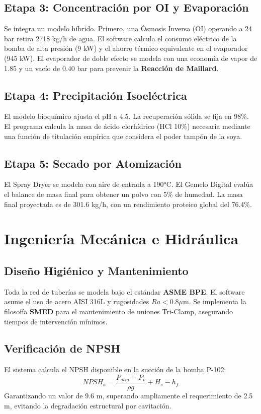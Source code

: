 \documentclass[12pt,a4paper,twocolumn]{article}
\begin{document}
\subsection{Etapa 3: Concentración por OI y Evaporación}
Se integra un modelo híbrido. Primero, una Ósmosis Inversa (OI) operando a 24 bar retira 2718 kg/h de agua. El software calcula el consumo eléctrico de la bomba de alta presión (9 kW) y el ahorro térmico equivalente en el evaporador (945 kW). 
El evaporador de doble efecto se modela con una economía de vapor de 1.85 y un vacío de 0.40 bar para prevenir la \textbf{Reacción de Maillard}.

\subsection{Etapa 4: Precipitación Isoeléctrica}
El modelo bioquímico ajusta el pH a 4.5. La recuperación sólida se fija en 98\%. El programa calcula la masa de ácido clorhídrico (HCl 10\%) necesaria mediante una función de titulación empírica que considera el poder tampón de la soya.

\subsection{Etapa 5: Secado por Atomización}
El Spray Dryer se modela con aire de entrada a 190°C. El Gemelo Digital evalúa el balance de masa final para obtener un polvo con 5\% de humedad. La masa final proyectada es de 301.6 kg/h, con un rendimiento proteico global del 76.4\%.

\section{Ingeniería Mecánica e Hidráulica}

\subsection{Diseño Higiénico y Mantenimiento}
Toda la red de tuberías se modela bajo el estándar \textbf{ASME BPE}. El software asume el uso de acero AISI 316L y rugosidades $Ra < 0.8 \mu$m. Se implementa la filosofía \textbf{SMED} para el mantenimiento de uniones Tri-Clamp, asegurando tiempos de intervención mínimos.

\subsection{Verificación de NPSH}
El sistema calcula el NPSH disponible en la succión de la bomba P-102:
\begin{equation}
    NPSH_a = \frac{P_{atm} - P_v}{\rho g} + H_s - h_f
\end{equation}
Garantizando un valor de 9.6 m, superando ampliamente el requerimiento de 2.5 m, evitando la degradación estructural por cavitación.
\end{document}
